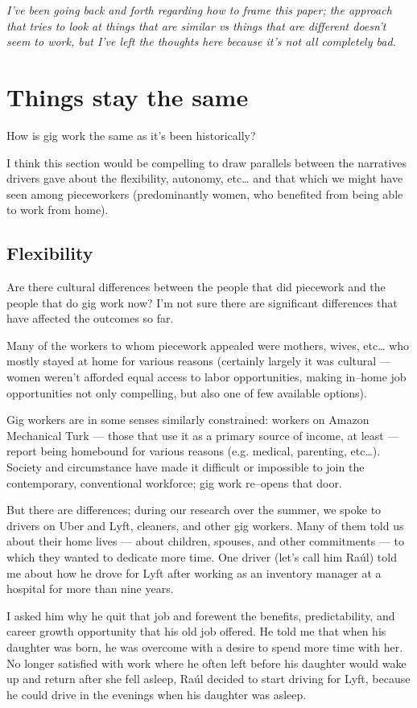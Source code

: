 \documentclass{sigchi}
\begin{document}
\textit{I've been going back and forth regarding how to frame this paper;
the approach that tries to look at
things that are similar vs things that are different
doesn't seem to work, but
I've left the thoughts here because it's not all completely bad.}

\section{Things stay the same}
How is gig work the same as it's been historically?

I think this section would be compelling to draw parallels between
the narratives drivers gave about the flexibility, autonomy, etc\dots
and that which we might have seen among pieceworkers
(predominantly women, who benefited from being able to work from home).

\subsection{Flexibility}
Are there cultural differences between the people that did piecework and
the people that do gig work now?
I'm not sure there are significant differences that have affected the outcomes so far.

Many of the workers to whom piecework appealed were mothers, wives, etc\dots
who mostly stayed at home for various reasons
(certainly largely it was cultural
--- women weren't afforded equal access to labor opportunities,
making in--home job opportunities not only compelling, but also one of few available options).

Gig workers are in some senses similarly constrained:
workers on Amazon Mechanical Turk
--- those that use it as a primary source of income, at least ---
report being homebound for various reasons (e.g. medical, parenting, etc\dots).
Society and circumstance have made it difficult
or impossible
to join the contemporary, conventional workforce;
gig work re--opens that door.

But there are differences; during our research over the summer,
we spoke to drivers on Uber and Lyft, cleaners, and other gig workers.
Many of them told us about their home lives
--- about children, spouses, and other commitments ---
to which they wanted to dedicate more time.
One driver
(let's call him Ra\'{u}l)
told me about how he drove for Lyft
after working as an inventory manager at a hospital for more than nine years.

I asked him why he quit that job and forewent
the benefits,
predictability,
and career growth opportunity
that his old job offered.
He told me that when his daughter was born,
he was overcome with a desire to spend more time with her.
No longer satisfied with work
where he often left before his daughter would wake up and return after she fell asleep,
Ra\'{u}l decided to start driving for Lyft,
because he could drive in the evenings when his daughter was asleep.
\end{document}
